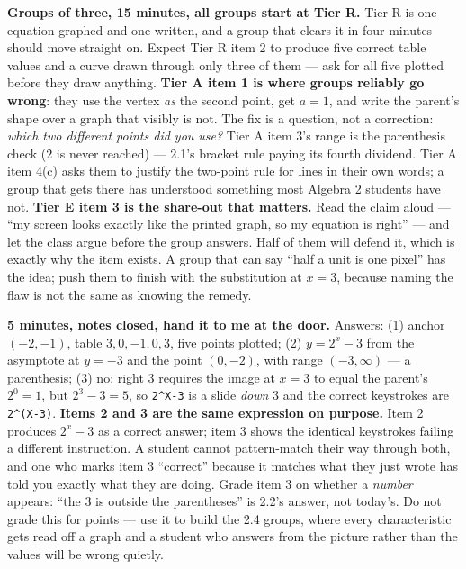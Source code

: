 \documentclass[10pt]{article}
\begin{document}
\boxguard[18]
\begin{teachernote}
    \textbf{Groups of three, 15 minutes, all groups start at Tier R.} Tier R is one equation graphed
    and one written, and a group that clears it in four minutes should move straight on. Expect Tier R
    item 2 to produce five correct table values and a curve drawn through only three of them --- ask
    for all five plotted before they draw anything. \textbf{Tier A item 1 is where groups reliably go
    wrong}: they use the vertex \emph{as} the second point, get $a=1$, and write the parent's shape
    over a graph that visibly is not. The fix is a question, not a correction: \emph{which two
    different points did you use?} Tier A item 3's range is the parenthesis check ($2$ is never
    reached) --- 2.1's bracket rule paying its fourth dividend. Tier A item 4(c) asks them to justify
    the two-point rule for lines in their own words; a group that gets there has understood something
    most Algebra 2 students have not. \textbf{Tier E item 3 is the share-out that matters.} Read the
    claim aloud --- ``my screen looks exactly like the printed graph, so my equation is right'' --- and
    let the class argue before the group answers. Half of them will defend it, which is exactly why
    the item exists. A group that can say ``half a unit is one pixel'' has the idea; push them to
    finish with the substitution at $x=3$, because naming the flaw is not the same as knowing the
    remedy.
\end{teachernote}

\boxguard[18]
\begin{teachernote}
    \textbf{5 minutes, notes closed, hand it to me at the door.} Answers: (1) anchor $(-2,-1)$, table
    $3,0,-1,0,3$, five points plotted; (2) $y=2^x-3$ from the asymptote at $y=-3$ and the point
    $(0,-2)$, with range $(-3,\infty)$ --- a parenthesis; (3) no: right $3$ requires the image at
    $x=3$ to equal the parent's $2^0=1$, but $2^3-3=5$, so \texttt{2\^{}X-3} is a slide \emph{down}
    $3$ and the correct keystrokes are \texttt{2\^{}(X-3)}. \textbf{Items 2 and 3 are the same
    expression on purpose.} Item 2 produces $2^x-3$ as a correct answer; item 3 shows the identical
    keystrokes failing a different instruction. A student cannot pattern-match their way through
    both, and one who marks item 3 ``correct'' because it matches what they just wrote has told you
    exactly what they are doing. Grade item 3 on whether a \emph{number} appears: ``the $3$ is
    outside the parentheses'' is 2.2's answer, not today's. Do not grade this for points --- use it
    to build the 2.4 groups, where every characteristic gets read off a graph and a student who
    answers from the picture rather than the values will be wrong quietly.
\end{teachernote}
\end{document}
